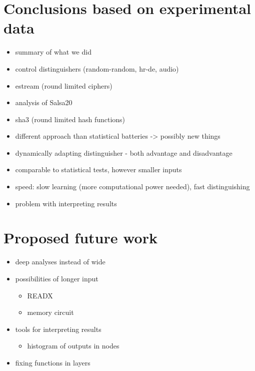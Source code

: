 \documentclass[12pt,oneside]{fithesis2}
\begin{document}
\section{Conclusions based on experimental data}
\label{sec:outro-conclusions}

\begin{itemize}
\item summary of what we did
\item control distinguishers (random-random, hr-de, audio)
\item estream (round limited ciphers)
\item analysis of Salsa20
\item sha3 (round limited hash functions)
\end{itemize}

\begin{itemize}
\item different approach than statistical batteries -> possibly new things
\item dynamically adapting distinguisher - both advantage and disadvantage
\item comparable to statistical tests, however smaller inputs
\item speed: slow learning (more computational power needed), fast distinguishing
\item problem with interpreting results
\end{itemize}

\section{Proposed future work}
\label{sec:outro-future-work}

\begin{itemize}
\item deep analyses instead of wide
\item possibilities of longer input 
\begin{itemize}
\item READX
\item memory circuit
\end{itemize}
\item tools for interpreting results
\begin{itemize}
\item histogram of outputs in nodes
\end{itemize}
\item fixing functions in layers
\end{itemize}

\nocite{*}
\printbibliography
\end{document}
